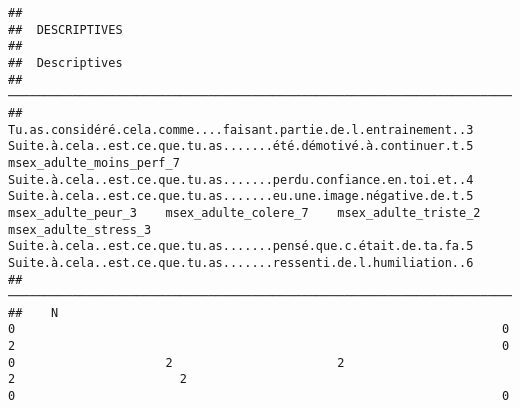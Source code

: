 \documentclass[
]{article}
\begin{document}
\begin{verbatim}
## 
##  DESCRIPTIVES
## 
##  Descriptives                                                                                                                                                                                                                                                                                                                                                                                                                                                                                                                                                        
##  ─────────────────────────────────────────────────────────────────────────────────────────────────────────────────────────────────────────────────────────────────────────────────────────────────────────────────────────────────────────────────────────────────────────────────────────────────────────────────────────────────────────────────────────────────────────────────────────────────────────────────────────────────────────────────────────────────────────────────────────────────────────────────────────────────────────────────────────────────── 
##               Tu.as.considéré.cela.comme....faisant.partie.de.l.entrainement..3    Suite.à.cela..est.ce.que.tu.as.......été.démotivé.à.continuer.t.5    msex_adulte_moins_perf_7    Suite.à.cela..est.ce.que.tu.as.......perdu.confiance.en.toi.et..4    Suite.à.cela..est.ce.que.tu.as.......eu.une.image.négative.de.t.5    msex_adulte_peur_3    msex_adulte_colere_7    msex_adulte_triste_2    msex_adulte_stress_3    Suite.à.cela..est.ce.que.tu.as.......pensé.que.c.était.de.ta.fa.5    Suite.à.cela..est.ce.que.tu.as.......ressenti.de.l.humiliation..6   
##  ─────────────────────────────────────────────────────────────────────────────────────────────────────────────────────────────────────────────────────────────────────────────────────────────────────────────────────────────────────────────────────────────────────────────────────────────────────────────────────────────────────────────────────────────────────────────────────────────────────────────────────────────────────────────────────────────────────────────────────────────────────────────────────────────────────────────────────────────────── 
##    N                                                                          0                                                                    0                           2                                                                    0                                                                    0                     2                       2                       2                       2                                                                    0                                                                    0   

\end{verbatim}
\end{document}
